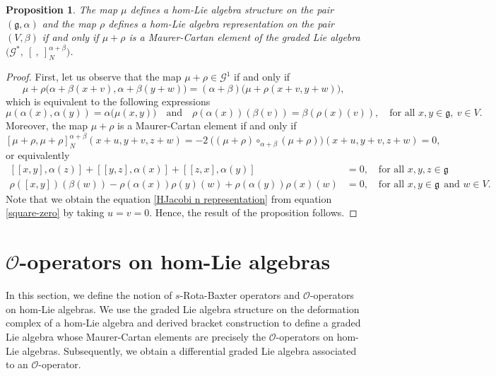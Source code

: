 \documentclass[a4paper,11pt]{amsart}
\theoremstyle{plain}
\newtheorem{proposition}[theorem]{Proposition}
\theoremstyle{definition}
\theoremstyle{remark}
\numberwithin{equation}{section}
\begin{document}
\begin{proposition}\label{Maurer-Cartan}
The map $\mu$ defines a hom-Lie algebra structure on the pair $(\mathfrak{g},\alpha)$ and the map $\rho$ defines a hom-Lie algebra representation on the pair $(V,\beta)$ if and only if $\mu+\rho$ is a Maurer-Cartan element of the graded Lie algebra $\textstyle{\big(\mathcal{G}^*,~[~,~]_N^{\alpha+\beta}\big)}$.
\end{proposition}
\begin{proof}
First, let us observe that the map $\mu+\rho\in \mathcal{G}^1$ if and only if 
$$\mu+\rho\big(\alpha+\beta(x+v),\alpha+\beta(y+w)\big)=(\alpha+\beta)\big(\mu+\rho(x+v,y+w)\big),$$
which is equivalent to the following expressions
$$\mu(\alpha(x),\alpha(y))=\alpha\big(\mu(x,y)\big)\quad \mbox{and}\quad \rho(\alpha(x))(\beta(v))=\beta(\rho(x)(v)),\quad \mbox{for all }x,y\in \mathfrak{g},~v\in V.$$
Moreover, the map $\mu+\rho$ is a Maurer-Cartan element if and only if 
\begin{equation}\label{square-zero}
\textstyle{[\mu+\rho,\mu+\rho]_N^{\alpha+\beta}(x+u,y+v,z+w)=-2~\big((\mu+\rho)\circ_{\alpha+\beta}(\mu+\rho)\big)(x+u,y+v,z+w)=0},
\end{equation}
or equivalently
\begin{align}\label{HJacobi n representation}
\nonumber
[[x,y],\alpha(z)]+[[y,z],\alpha(x)]+[[z,x],\alpha(y)]&=0,\quad \mbox{for all }x,y,z \in \mathfrak{g}\\
\rho([x,y])(\beta(w))- \rho(\alpha(x))\rho(y)(w)+\rho(\alpha(y))\rho(x)(w)&=0,\quad \mbox{for all }x,y\in \mathfrak{g}~~\mbox{and }w\in V.
\end{align} 
Note that we obtain the equation \eqref{HJacobi n representation} from equation \eqref{square-zero} by taking $u=v=0$. Hence, the result of the proposition follows.
\end{proof}


\section{\normalfont\large\textbf{{$\mathcal{O}$-operators on hom-Lie algebras}}}

In this section, we define the notion of $s$-Rota-Baxter operators and $\mathcal{O}$-operators on hom-Lie algebras. We use the graded Lie algebra structure on the deformation complex of a hom-Lie algebra and derived bracket construction to define a graded Lie algebra whose Maurer-Cartan elements are precisely the $\mathcal{O}$-operators on hom-Lie algebras. Subsequently, we obtain a differential graded Lie algebra associated to an $\mathcal{O}$-operator. 
\end{document}
